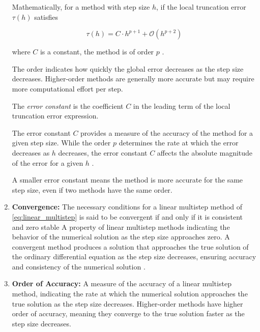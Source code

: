 \begin{enumerate}
Mathematically, for a method with step size \( h \), if the local truncation error \( \tau(h) \) satisfies

\begin{equation}
  \tau(h) = C \cdot h^{p+1} + \mathcal{O}(h^{p+2})
\end{equation}

where \( C \) is a constant, the method is of order \( p \) \cite{BUTCHER20091834}.

The order indicates how quickly the global error decreases as the step size decreases. Higher-order methods are generally more accurate but may require more computational effort per step.


The \textit{error constant} is the coefficient \( C \) in the leading term of the local truncation error expression.

The error constant \( C \) provides a measure of the accuracy of the method for a given step size. While the order \( p \) determines the rate at which the error decreases as \( h \) decreases, the error constant \( C \) affects the absolute magnitude of the error for a given \( h \) \cite{atkinson1989introduction}.

A smaller error constant means the method is more accurate for the same step size, even if two methods have the same order.


    \item \textbf{Convergence:}
    The necessary conditions for a linear multistep method of \eqref{eq:linear_multistep} is said to be convergent if and only if it is consistent and zero stable
    A property of linear multistep methods indicating the behavior of the numerical solution as the step size approaches zero. A convergent method produces a solution that approaches the true solution of the ordinary differential equation as the step size decreases, ensuring accuracy and consistency of the numerical solution \cite{2021Deborah}.

    \item \textbf{Order of Accuracy:} A measure of the accuracy of a linear multistep method, indicating the rate at which the numerical solution approaches the true solution as the step size decreases. Higher-order methods have higher order of accuracy, meaning they converge to the true solution faster as the step size decreases.
\end{enumerate}